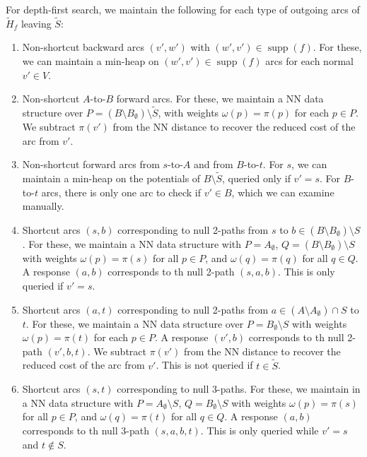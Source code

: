 \documentclass[a4paper,UKenglish]{socg-lipics-v2018}
\def\supp{\operatorname{supp}}
\theoremstyle{plain}
\numberwithin{figure}{section}
\begin{document}
\begin{toappendix}

For depth-first search, we maintain the following for each type of outgoing arcs of $\tilde{H}_f$ leaving $\tilde{S}$:
%
\begin{enumerate}
\item Non-shortcut backward arcs $(v', w')$ with $(w', v') \in \supp(f)$.
	For these, we can maintain a min-heap on $(w', v') \in \supp(f)$ arcs
	for each normal $v' \in V$.
\item Non-shortcut $A$-to-$B$ forward arcs.
	For these, we maintain a NN data structure over
	$P = (B \setminus B_\emptyset) \setminus \tilde{S}$, with weights
	$\omega(p) = \pi(p)$ for each $p \in P$.
	We subtract $\pi(v')$ from the NN distance to recover the reduced cost
	of the arc from $v'$.
\item Non-shortcut forward arcs from $s$-to-$A$ and from $B$-to-$t$.
	For $s$, we can maintain a min-heap on the potentials of
	$B \setminus \tilde{S}$, queried only if $v' = s$.
	For $B$-to-$t$ arcs, there is only one arc to check if $v' \in B$,
	which we can examine manually.

\item Shortcut arcs $(s, b)$ corresponding to null 2-paths from $s$ to
	$b \in (B \setminus B_\emptyset) \setminus S$.
	For these, we maintain a NN data structure with $P = A_\emptyset$,
	$Q = (B \setminus B_\emptyset) \setminus S$ with weights
	$\omega(p) = \pi(s)$ for all $p \in P$, and $\omega(q) = \pi(q)$ for
	all $q \in Q$.
	A response $(a, b)$ corresponds to th null 2-path $(s, a, b)$.
	This is only queried if $v' = s$.
\item Shortcut arcs $(a, t)$ corresponding to null 2-paths from
	$a \in (A \setminus A_\emptyset) \cap S$ to $t$.
	For these, we maintain a NN data structure over
	$P = B_\emptyset \setminus S$ with weights $\omega(p) = \pi(t)$ for
	each $p \in P$.
	A response $(v', b)$ corresponds to th null 2-path $(v', b, t)$.
	We subtract $\pi(v')$ from the NN distance to recover the reduced cost
	of the arc from $v'$.
	This is not queried if $t \in \tilde{S}$.
\item Shortcut arcs $(s, t)$ corresponding to null 3-paths.
	For these, we maintain in a NN data structure with
	$P = A_\emptyset \setminus S$, $Q = B_\emptyset \setminus S$ with
	weights $\omega(p) = \pi(s)$ for all
	$p \in P$, and $\omega(q) = \pi(t)$ for all $q \in Q$.
	A response $(a, b)$ corresponds to th null 3-path $(s, a, b, t)$.
	This is only queried while $v' = s$ and $t \not\in S$.
\end{enumerate}

\end{toappendix}
\end{document}
